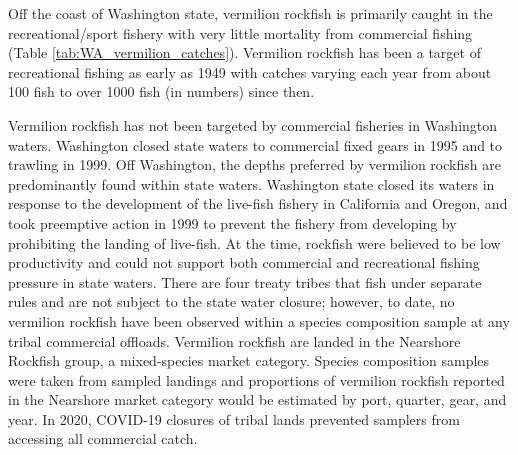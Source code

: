 \documentclass[11pt,
  english,
  a4paper,
]{article}
\begin{document}
Off the coast of Washington state, vermilion rockfish is primarily caught in the recreational/sport fishery with very little mortality from commercial fishing (Table \ref{tab:WA_vermilion_catches}). Vermilion rockfish has been a target of recreational fishing as early as 1949 with catches varying each year from about 100 fish to over 1000 fish (in numbers) since then.

\leavevmode\tagmcend\tagstructend\par


Vermilion rockfish has not been targeted by commercial fisheries in Washington waters. Washington closed state waters to commercial fixed gears in 1995 and to trawling in 1999. Off Washington, the depths preferred by vermilion rockfish are predominantly found within state waters. Washington state closed its waters in response to the development of the live-fish fishery in California and Oregon, and took preemptive action in 1999 to prevent the fishery from developing by prohibiting the landing of live-fish. At the time, rockfish were believed to be low productivity and could not support both commercial and recreational fishing pressure in state waters. There are four treaty tribes that fish under separate rules and are not subject to the state water closure; however, to date, no vermilion rockfish have been observed within a species composition sample at any tribal commercial offloads. Vermilion rockfish are landed in the Nearshore Rockfish group, a mixed-species market category. Species composition samples were taken from sampled landings and proportions of vermilion rockfish reported in the Nearshore market category would be estimated by port, quarter, gear, and year. In 2020, COVID-19 closures of tribal lands prevented samplers from accessing all commercial catch.

\leavevmode\tagmcend\tagstructend\par

\end{document}

